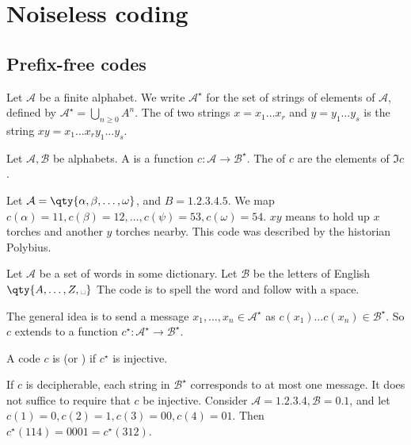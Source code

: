 \section{Noiseless coding}
\subsection{Prefix-free codes}
Let $\mathcal A$ be a finite alphabet.
We write $\mathcal A^\star$ for the set of strings of elements of $\mathcal A$, defined by $\mathcal A^\star = \bigcup_{n \geq 0} A^n$.
The  of two strings $x = x_1 \dots x_r$ and $y = y_1 \dots y_s$ is the string $xy = x_1 \dots x_r y_1 \dots y_s$.

\begin{definition}[Code]
    Let $\mathcal A, \mathcal B$ be alphabets.
    A  is a function $c \colon \mathcal A \to \mathcal B^\star$.
    The  of $c$ are the elements of $\Im c$.
\end{definition}

\begin{example}
    Let $\mathcal A = \qty{\alpha, \beta, \dots, \omega}$, and $B = \qty{1, 2, 3, 4, 5}$.
    We map $c(\alpha) = 11, c(\beta) = 12, \dots, c(\psi) = 53, c(\omega) = 54$.
    $xy$ means to hold up $x$ torches and another $y$ torches nearby.
    This code was described by the historian Polybius.
\end{example}

\begin{example}
    Let $\mathcal A$ be a set of words in some dictionary.
    Let $\mathcal B$ be the letters of English $\qty{A, \dots, Z, \text{\textvisiblespace}}$
    The code is to spell the word and follow with a space.
\end{example}

The general idea is to send a message $x_1, \dots, x_n \in \mathcal A^\star$ as $c(x_1) \dots c(x_n) \in \mathcal B^\star$.
So $c$ extends to a function $c^\star \colon \mathcal A^\star \to \mathcal B^\star$.

\begin{definition}[Decipherable]
    A code $c$ is  (or ) if $c^\star$ is injective.
\end{definition}

If $c$ is decipherable, each string in $\mathcal B^\star$ corresponds to at most one message.
It does not suffice to require that $c$ be injective.
Consider $\mathcal A = \qty{1, 2, 3, 4}, \mathcal B = \qty{0,1}$, and let $c(1) = 0, c(2) = 1, c(3) = 00, c(4) = 01$.
Then $c^\star(114) = 0001 = c^\star(312)$.

